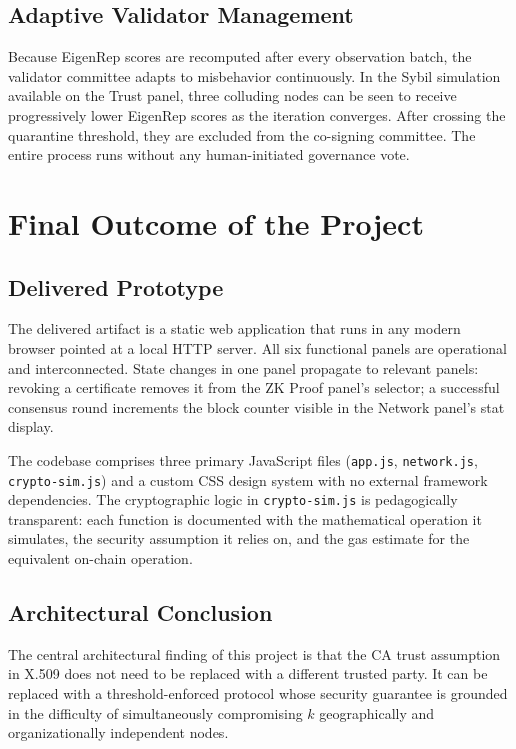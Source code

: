\documentclass[12pt,a4paper]{article}
\begin{document}
\subsection{Adaptive Validator Management}
Because EigenRep scores are recomputed after every observation batch, the validator committee adapts to misbehavior continuously. In the Sybil simulation available on the Trust panel, three colluding nodes can be seen to receive progressively lower EigenRep scores as the iteration converges. After crossing the quarantine threshold, they are excluded from the co-signing committee. The entire process runs without any human-initiated governance vote.

\section{Final Outcome of the Project}

\subsection{Delivered Prototype}

The delivered artifact is a static web application that runs in any modern browser pointed at a local HTTP server. All six functional panels are operational and interconnected. State changes in one panel propagate to relevant panels: revoking a certificate removes it from the ZK Proof panel's selector; a successful consensus round increments the block counter visible in the Network panel's stat display.

The codebase comprises three primary JavaScript files (\texttt{app.js}, \texttt{network.js}, \texttt{crypto-sim.js}) and a custom CSS design system with no external framework dependencies. The cryptographic logic in \texttt{crypto-sim.js} is pedagogically transparent: each function is documented with the mathematical operation it simulates, the security assumption it relies on, and the gas estimate for the equivalent on-chain operation.

\subsection{Architectural Conclusion}

The central architectural finding of this project is that the CA trust assumption in X.509 does not need to be replaced with a different trusted party. It can be replaced with a threshold-enforced protocol whose security guarantee is grounded in the difficulty of simultaneously compromising $k$ geographically and organizationally independent nodes.
\end{document}
